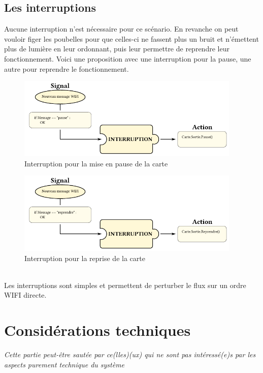 \subsection{Les interruptions}
Aucune interruption n'est nécessaire pour ce scénario. En revanche on peut vouloir figer les poubelles pour que celles-ci ne fassent plus un bruit et n'émettent plus de lumière en leur ordonnant, puis leur permettre de reprendre leur fonctionnement.\p
Voici une proposition avec une interruption pour la pause, une autre pour reprendre le fonctionnement.
\newpage
\begin{figure}[htbp]
  \centering
  \includegraphics[width=0.95\textwidth]{figs/poubelle_interruption_pause.pdf}
  \caption{Interruption pour la mise en pause de la carte}
  \label{fig:ex_poubelle_interruption_pause}
  \vspace{-17pt}
\end{figure}
\begin{figure}[htbp]
  \centering
  \includegraphics[width=0.95\textwidth]{figs/poubelle_interruption_resume.pdf}
  \caption{Interruption pour la reprise de la carte}
  \label{fig:ex_poubelle_interruption_resume}
\end{figure} ~\\
Les interruptions sont simples et permettent de perturber le flux sur un ordre WIFI directe.


\newpage
\section{Considérations techniques}
\indent \textit{Cette partie peut-être sautée par ce(lles)(ux) qui ne sont pas intéressé(e)s par les aspects purement technique du système}
